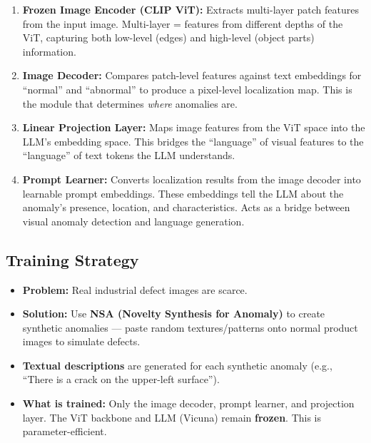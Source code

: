 \documentclass[12pt, a4paper]{article}
\begin{document}
\begin{enumerate}[leftmargin=*]
    \item \textbf{Frozen Image Encoder (CLIP ViT):} Extracts multi-layer patch features from the input image. Multi-layer = features from different depths of the ViT, capturing both low-level (edges) and high-level (object parts) information.

    \item \textbf{Image Decoder:} Compares patch-level features against text embeddings for ``normal'' and ``abnormal'' to produce a pixel-level localization map. This is the module that determines \textit{where} anomalies are.

    \item \textbf{Linear Projection Layer:} Maps image features from the ViT space into the LLM's embedding space. This bridges the ``language'' of visual features to the ``language'' of text tokens the LLM understands.

    \item \textbf{Prompt Learner:} Converts localization results from the image decoder into learnable prompt embeddings. These embeddings tell the LLM about the anomaly's presence, location, and characteristics. Acts as a bridge between visual anomaly detection and language generation.
\end{enumerate}

\subsection{Training Strategy}

\begin{itemize}[leftmargin=*]
    \item \textbf{Problem:} Real industrial defect images are scarce.
    \item \textbf{Solution:} Use \textbf{NSA (Novelty Synthesis for Anomaly)} to create synthetic anomalies --- paste random textures/patterns onto normal product images to simulate defects.
    \item \textbf{Textual descriptions} are generated for each synthetic anomaly (e.g., ``There is a crack on the upper-left surface'').
    \item \textbf{What is trained:} Only the image decoder, prompt learner, and projection layer. The ViT backbone and LLM (Vicuna) remain \textbf{frozen}. This is parameter-efficient.
\end{itemize}
\end{document}
